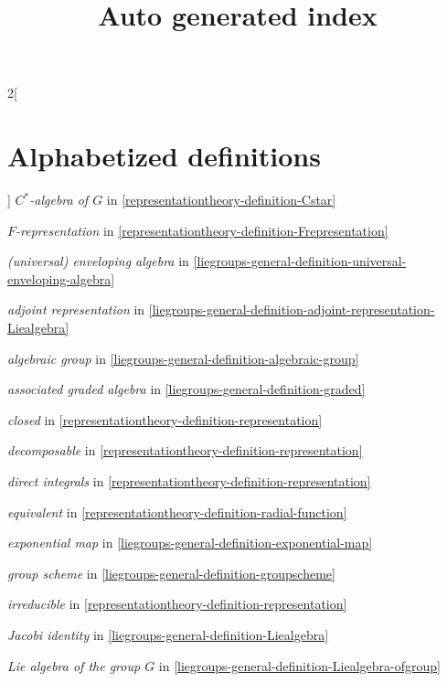 

\title{Auto generated index}
\maketitle

\label{section-phantom}

\tableofcontents

\frenchspacing


\begin{multicols}{2}[\section{Alphabetized definitions}\label{section-alphabetized}]
\noindent
{\it $C^*$-algebra of $G$}
in \ref{representationtheory-definition-Cstar}

\noindent
{\it $F$-representation}
in \ref{representationtheory-definition-Frepresentation}

\noindent
{\it (universal) enveloping algebra}
in \ref{liegroups-general-definition-universal-enveloping-algebra}

\noindent
{\it adjoint representation}
in \ref{liegroups-general-definition-adjoint-representation-Liealgebra}

\noindent
{\it algebraic group}
in \ref{liegroups-general-definition-algebraic-group}

\noindent
{\it associated graded algebra}
in \ref{liegroups-general-definition-graded}

\noindent
{\it closed}
in \ref{representationtheory-definition-representation}

\noindent
{\it decomposable}
in \ref{representationtheory-definition-representation}

\noindent
{\it direct integrals}
in \ref{representationtheory-definition-representation}

\noindent
{\it equivalent}
in \ref{representationtheory-definition-radial-function}

\noindent
{\it exponential map}
in \ref{liegroups-general-definition-exponential-map}

\noindent
{\it group scheme}
in \ref{liegroups-general-definition-groupscheme}

\noindent
{\it irreducible}
in \ref{representationtheory-definition-representation}

\noindent
{\it Jacobi identity}
in \ref{liegroups-general-definition-Liealgebra}

\noindent
{\it Lie algebra of the group $G$}
in \ref{liegroups-general-definition-Liealgebra-ofgroup}


\end{multicols}
